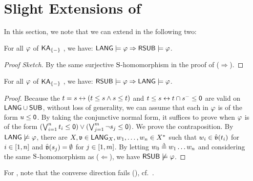 % 

\section{Slight Extensions of }\label{section: LANG and ORD for positive quantifier-free formulas}
In this section, we note that we can extend  in the following two:
\begin{theorem}\label{theorem: LANG and ORD for positive quantifier-free formulas}
    For all  $\fml$ of $\mathsf{KA}_{\{-\}}$ ,
    we have: $\LANG \models \fml \Rightarrow \RSUB \models \fml$.
\end{theorem}
\begin{proof}[Proof Sketch]
    By the same surjective $\mathrm{S}$-homomorphism in the proof of ($\Rightarrow$).
\end{proof}
\begin{theorem}\label{theorem: LANG and ORD for quantifier-free formulas}
    For all  $\fml$ of $\mathsf{KA}_{\{-\}}$ ,
    we have: $\RSUB \models \fml \Rightarrow \LANG \models \fml$.
\end{theorem}
\begin{proof}
    Because the  $\term[1] = \term[2] \leftrightarrow (\term[1] \le \term[2] \land \term[2] \le \term[1])$ and $\term[1] \le \term[2] \leftrightarrow \term[1] \cap \term[2]^{-} \le \emp$ are valid on $\mathsf{LANG} \cup \mathsf{SUB}$,
    without loss of generality, we can assume that each  in $\fml$ is of the form $\term[3] \le \emp$.
    By taking the conjunctive normal form,
    it suffices to prove when $\fml$ is of the form $(\bigvee_{i = 1}^{n} \term[1]_i \le \emp) \lor (\bigvee_{j = 1}^{m} \lnot \term[2]_j \le \emp)$.
    We prove the contraposition.
    By $\LANG \not\models \fml$, there are $X, \val \in \LANG_X, \word_1, \dots, \word_n \in X^*$ such that
    $\word_i \in \hat{\val}(\term[1]_i)$ for $i \in [1,n]$ and $\hat{\val}(\term[2]_j) = \emptyset$ for $j \in [1,m]$.
    By letting $\word_0 \defeq \word_1 \dots \word_n$ and considering the same $\mathrm{S}$-homomorphism as ($\Leftarrow$), we have $\RSUB \not\models \fml$.
\end{proof}
For ,
note that the converse direction fails (), cf.\ .

